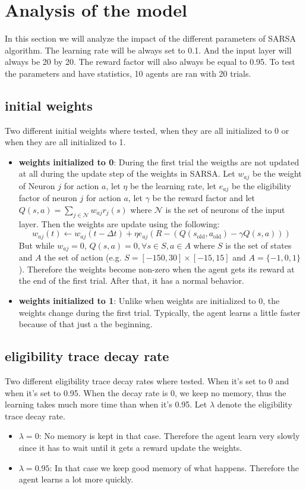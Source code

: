 \documentclass[12pt,a4paper]{article}
\begin{document}
\section*{Analysis of the model}
In this section we will analyze the impact of the different parameters of SARSA algorithm. The learning rate will be always set to 0.1. And the input layer will always be 20 by 20.
The reward factor will also always be equal to 0.95.
To test the parameters and have statistics, 10 agents are ran with 20 trials. 
\subsection*{initial weights}
Two different initial weights where tested, when they are all initialized to 0 or when they are all initialized to 1.
\begin{itemize}
    \item \textbf{weights initialized to 0}: During the first trial the weigths are not updated at all during the update step of the weights in SARSA. Let
    $w_{aj}$ be the weight of Neuron $j$ for action $a$, let $\eta$ be the learning rate, let $e_{aj}$ be the eligibility factor of neuron $j$ for action $a$, let $\gamma$ be the reward
    factor and let $Q(s,a) = \sum_{j \in \mathcal{N}}{w_{aj}r_j(s)}$ where $\mathcal{N}$ is the set of neurons of the input layer. Then the weights are update using the following:
    \[
    w_{aj}(t) \leftarrow w_{aj}(t-\Delta t) + \eta e_{aj}\left(R - ( Q(s_{\mathrm{old}},a_{\mathrm{old}}) - \gamma Q(s,a)  ) \right)
    \]
    But while $w_{aj} = 0$, $Q(s,a) = 0, \forall s\in S,a\in A$ where $S$ is the set of states and $A$ the set of action (e.g. $S = [-150,30]\times[-15,15]$ and $A = \{-1,0,1\}$).
    Therefore the weights become non-zero when the agent gets its reward at the end of the first trial. After that, it has a normal behavior.

    \item \textbf{weights initialized to 1}: Unlike when weights are initialized to 0, the weights change during the first trial. Typically, the agent learns a little faster because of that
    just a the beginning.
\end{itemize}

\subsection*{eligibility trace decay rate}
Two different eligibility trace decay rates where tested. When it's set to 0 and when it's set to 0.95. When the decay rate is 0, we keep no memory, thus the learning takes much more time 
than when it's 0.95. Let $\lambda$ denote the eligibility trace decay rate.
\begin{itemize}
    \item \textbf{$\lambda = 0$}: No memory is kept in that case. Therefore the agent learn very slowly since it has to wait until it gets a reward update the weights.
    \item \textbf{$\lambda = 0.95$}: In that case we keep good memory of what happens. Therefore the agent learns a lot more quickly.
\end{itemize}
\end{document}
